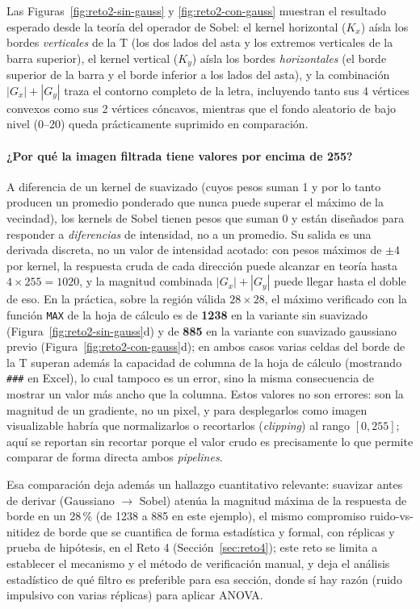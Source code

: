 \documentclass[11pt]{article}
\begin{document}
Las Figuras~\ref{fig:reto2-sin-gauss} y \ref{fig:reto2-con-gauss} muestran
el resultado esperado desde la teoría del operador de Sobel: el kernel
horizontal ($K_x$) aísla los bordes \emph{verticales} de la T (los dos
lados del asta y los extremos verticales de la barra superior), el kernel
vertical ($K_y$) aísla los bordes \emph{horizontales} (el borde superior
de la barra y el borde inferior a los lados del asta), y la combinación
$|G_x|+|G_y|$ traza el contorno completo de la letra, incluyendo tanto sus
4 vértices convexos como sus 2 vértices cóncavos, mientras que el fondo
aleatorio de bajo nivel (0--20) queda prácticamente suprimido en
comparación.

\paragraph{¿Por qué la imagen filtrada tiene valores por encima de 255?}
A diferencia de un kernel de suavizado (cuyos pesos suman 1 y por lo tanto
producen un promedio ponderado que nunca puede superar el máximo de la
vecindad), los kernels de Sobel tienen pesos que suman 0 y están diseñados
para responder a \emph{diferencias} de intensidad, no a un promedio. Su
salida es una derivada discreta, no un valor de intensidad acotado: con
pesos máximos de $\pm 4$ por kernel, la respuesta cruda de cada dirección
puede alcanzar en teoría hasta $4\times 255 = 1020$, y la magnitud
combinada $|G_x|+|G_y|$ puede llegar hasta el doble de eso. En la práctica,
sobre la región válida $28\times 28$, el máximo verificado con la función
\texttt{MAX} de la hoja de cálculo es de \textbf{1238} en la variante sin
suavizado (Figura~\ref{fig:reto2-sin-gauss}d) y de \textbf{885} en la
variante con suavizado gaussiano previo (Figura~\ref{fig:reto2-con-gauss}d);
en ambos casos varias celdas del borde de la T superan además la capacidad
de columna de la hoja de cálculo (mostrando \texttt{\#\#\#} en Excel), lo
cual tampoco es un error, sino la misma consecuencia de mostrar un valor
más ancho que la columna. Estos valores no son errores: son la magnitud de
un gradiente, no un pixel, y para desplegarlos como imagen visualizable
habría que normalizarlos o recortarlos (\emph{clipping}) al rango
$[0,255]$; aquí se reportan sin recortar porque el valor crudo es
precisamente lo que permite comparar de forma directa ambos
\emph{pipelines}.

Esa comparación deja además un hallazgo cuantitativo relevante: suavizar
antes de derivar (Gaussiano $\rightarrow$ Sobel) atenúa la magnitud máxima
de la respuesta de borde en un 28\,\% (de 1238 a 885 en este ejemplo), el
mismo compromiso ruido-vs-nitidez de borde que se cuantifica de forma
estadística y formal, con réplicas y prueba de hipótesis, en el Reto 4
(Sección~\ref{sec:reto4}); este reto se limita a establecer el mecanismo y
el método de verificación manual, y deja el análisis estadístico de qué
filtro es preferible para esa sección, donde sí hay razón (ruido impulsivo
con varias réplicas) para aplicar ANOVA.
\end{document}
